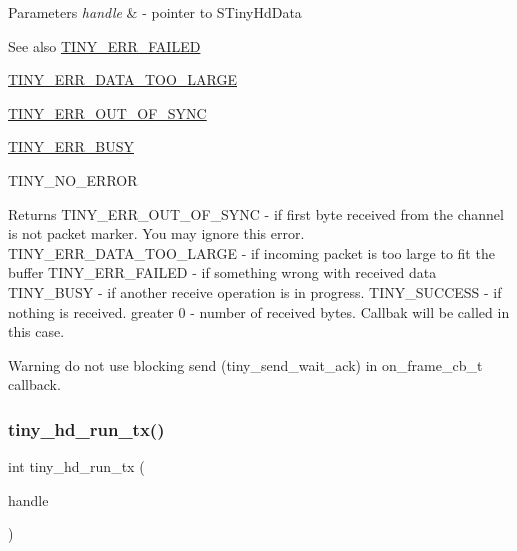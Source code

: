 \begin{DoxyParams}{Parameters}
{\em handle} & -\/ pointer to S\+Tiny\+Hd\+Data \\
\hline
\end{DoxyParams}
\begin{DoxySeeAlso}{See also}
\hyperlink{group__ERROR__FLAGS_ga84e6ca143550038e1a71cf36078d1926}{T\+I\+N\+Y\+\_\+\+E\+R\+R\+\_\+\+F\+A\+I\+L\+ED} 

\hyperlink{group__ERROR__FLAGS_ga7bbe7440d11ad304b0af68e011f4eab7}{T\+I\+N\+Y\+\_\+\+E\+R\+R\+\_\+\+D\+A\+T\+A\+\_\+\+T\+O\+O\+\_\+\+L\+A\+R\+GE} 

\hyperlink{group__ERROR__FLAGS_gae1949de45d9c478830dad9c9b996193a}{T\+I\+N\+Y\+\_\+\+E\+R\+R\+\_\+\+O\+U\+T\+\_\+\+O\+F\+\_\+\+S\+Y\+NC} 

\hyperlink{group__ERROR__FLAGS_ga9b3e170e1c6ce269f216ef4a1ac61995}{T\+I\+N\+Y\+\_\+\+E\+R\+R\+\_\+\+B\+U\+SY} 

T\+I\+N\+Y\+\_\+\+N\+O\+\_\+\+E\+R\+R\+OR 
\end{DoxySeeAlso}
\begin{DoxyReturn}{Returns}
T\+I\+N\+Y\+\_\+\+E\+R\+R\+\_\+\+O\+U\+T\+\_\+\+O\+F\+\_\+\+S\+Y\+NC -\/ if first byte received from the channel is not packet marker. You may ignore this error. T\+I\+N\+Y\+\_\+\+E\+R\+R\+\_\+\+D\+A\+T\+A\+\_\+\+T\+O\+O\+\_\+\+L\+A\+R\+GE -\/ if incoming packet is too large to fit the buffer T\+I\+N\+Y\+\_\+\+E\+R\+R\+\_\+\+F\+A\+I\+L\+ED -\/ if something wrong with received data T\+I\+N\+Y\+\_\+\+B\+U\+SY -\/ if another receive operation is in progress. T\+I\+N\+Y\+\_\+\+S\+U\+C\+C\+E\+SS -\/ if nothing is received. greater 0 -\/ number of received bytes. Callbak will be called in this case. 
\end{DoxyReturn}
\begin{DoxyWarning}{Warning}
do not use blocking send (tiny\+\_\+send\+\_\+wait\+\_\+ack) in on\+\_\+frame\+\_\+cb\+\_\+t callback. 
\end{DoxyWarning}
\mbox{\label{group__HALF__DUPLEX__API_ga84325cc961c3f31e2ba6111d0235bd61}} 
\subsubsection{\texorpdfstring{tiny\+\_\+hd\+\_\+run\+\_\+tx()}{tiny\_hd\_run\_tx()}}
{\footnotesize\ttfamily int tiny\+\_\+hd\+\_\+run\+\_\+tx (\begin{DoxyParamCaption}\item[{\hyperlink{group__HALF__DUPLEX__API_gaf9f81ad129b754a780dfca5dcd7f7cf9}{S\+Tiny\+Hd\+Data} $\ast$}]{handle }\end{DoxyParamCaption})}

